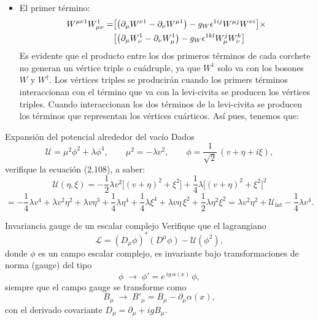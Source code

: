 \begin{itemize}
	\item El primer término: 
	\begin{align}  
		W^{\mu \nu 1} W_{\mu \nu}^1 = & \bqty{\pqty{\partial_\mu W^{\nu 1} - \partial_\nu W^{\mu 1}} - g_W \epsilon^{1ij} W^{\mu j} W^{\nu i}} \times \nonumber \\
		& \bqty{\pqty{\partial_\mu W^1_\nu - \partial_\nu W^1_\mu} - g_W 	\epsilon^{1kl} W^j_\mu W^k_\nu} 
	\end{align}
	Es evidente que el producto entre los dos primeros términos de cada corchete no generan un vértice triple o cuádruple, ya que $W^1$ solo va con los bosones $W$ y $W^\dagger$. Los vértices triples se producirán cuando los primers términos interaccionan con el término que va con la levi-civita se producen los vértices triples. Cuando interaccionan los dos términos de la levi-civita se producen los términos que representan los vértices cuárticos. Así pues, tenemos que: 

\end{itemize}




\begin{Ejercicio}{Expansión del potencial alrededor del vacío}\label{Ej:17}
Dados
\[
\mathcal{U}=\mu^2\phi^2+\lambda \phi^4,\qquad \mu^2=-\lambda v^2,\qquad 
\phi=\frac{1}{\sqrt{2}}\,(v+\eta+i\xi),
\]
verifique la ecuación (2.108), a saber:
\[
\mathcal{U}(\eta,\xi)= -\frac{1}{2}\lambda v^2\Big[(v+\eta)^2+\xi^2\Big]
+ \frac{1}{4}\lambda\Big[(v+\eta)^2+\xi^2\Big]^2
\]
\[
= -\frac{1}{4}\lambda v^4 + \lambda v^2\eta^2 + \lambda v\eta^3 + \frac{1}{4}\lambda\eta^4
+ \frac{1}{4}\lambda\xi^4 + \lambda v\eta\,\xi^2 + \frac{1}{2}\lambda \eta^2\xi^2
= \lambda v^2\eta^2 + \mathcal{U}_{\text{int}} - \frac{1}{4}\lambda v^4.
\]
\end{Ejercicio}


\begin{Ejercicio}{Invariancia gauge de un escalar complejo}\label{Ej:18}
Verifique que el lagrangiano
\[
\mathcal{L}=(D_\mu\phi)^\ast(D^\mu\phi)-\mathcal{U}(\phi^2),
\]
donde $\phi$ es un campo escalar complejo, es invariante bajo transformaciones de norma (gauge) del tipo
\[
\phi \;\to\; \phi' = e^{\,i g\,\alpha(x)}\,\phi,
\]
siempre que el campo gauge se transforme como
\[
B_\mu \;\to\; B'_\mu = B_\mu - \partial_\mu \alpha(x),
\]
con el derivado covariante $D_\mu=\partial_\mu + i g B_\mu$.
\end{Ejercicio}

